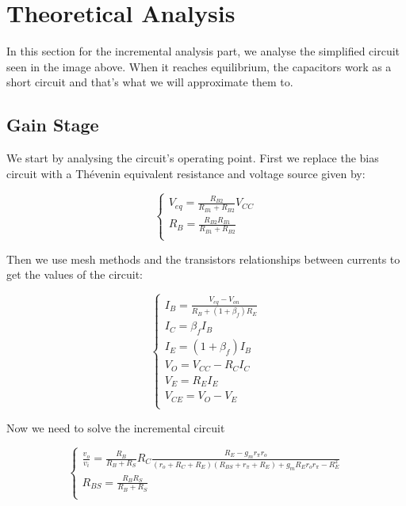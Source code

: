 \section{Theoretical Analysis}
\label{sec:analysis}


In this section for the incremental analysis part, we analyse the simplified circuit seen in the image above. When it reaches equilibrium, the capacitors work as a short circuit and that's what we will approximate them to.

\subsection{Gain Stage}
We start by analysing the circuit's operating point.
First we replace the bias circuit with a Thévenin equivalent resistance and voltage source given by:

\begin{equation}\label{eq:v_eq}
\begin{cases}
V_{eq}=\frac{R_{B2}}{R_{B1}+R_{B2}} V_{CC} \\
R_B=\frac{R_{B2}R_{B1}}{R_{B1}+R_{B2}}\\
\end{cases}
\end{equation}

Then we use mesh methods and the transistors relationships between currents to get the values of the circuit:

\begin{equation}\label{eq:Op1}
\begin{cases}
I_B=\frac{V_{eq}-V_{on}}{R_B+(1+\beta_f)R_{E}}\\
I_C=\beta_f I_B\\
I_E=(1+\beta_f)I_B\\
V_O=V_{CC}-R_C I_C\\
V_E=R_E I_E\\
V_{CE}=V_O-V_E\\
\end{cases}
\end{equation}

Now we need to solve the incremental circuit

\begin{equation}\label{eq:v1}
\begin{cases}
\frac{v_o}{v_i}=\frac{R_B}{R_B+R_S} R_C \frac{R_E-g_m r_\pi r_o}{(r_o+R_C+R_E)(R_{BS}+r_\pi+R_E)+g_m R_E r_o r_\pi - R_E^2}\\
R_{BS}=\frac{R_B R_S}{R_B+R_S}\\
\end{cases}
\end{equation}

